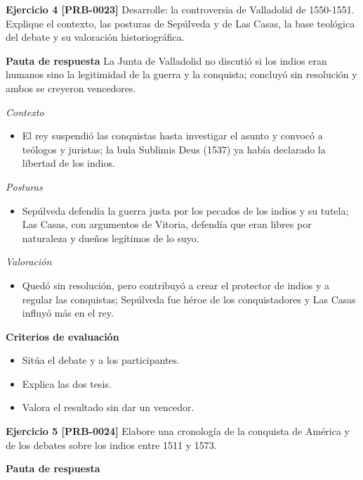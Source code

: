 \documentclass{book}
\begin{document}
\noindent\textbf{Ejercicio 4 [PRB-0023]}
Desarrolle: la controversia de Valladolid de 1550-1551. Explique el contexto, las posturas de Sepúlveda y de Las Casas, la base teológica del debate y su valoración historiográfica.


\noindent\textbf{Pauta de respuesta}
La Junta de Valladolid no discutió si los indios eran humanos sino la legitimidad de la guerra y la conquista; concluyó sin resolución y ambos se creyeron vencedores.


\noindent\textit{Contexto}
\begin{itemize}
\item El rey suspendió las conquistas hasta investigar el asunto y convocó a teólogos y juristas; la bula Sublimis Deus (1537) ya había declarado la libertad de los indios.
\end{itemize}

\noindent\textit{Posturas}
\begin{itemize}
\item Sepúlveda defendía la guerra justa por los pecados de los indios y su tutela; Las Casas, con argumentos de Vitoria, defendía que eran libres por naturaleza y dueños legítimos de lo suyo.
\end{itemize}

\noindent\textit{Valoración}
\begin{itemize}
\item Quedó sin resolución, pero contribuyó a crear el protector de indios y a regular las conquistas; Sepúlveda fue héroe de los conquistadores y Las Casas influyó más en el rey.
\end{itemize}

\noindent\textbf{Criterios de evaluación}
\begin{itemize}
\item Sitúa el debate y a los participantes.
\item Explica las dos tesis.
\item Valora el resultado sin dar un vencedor.
\end{itemize}

\noindent\textbf{Ejercicio 5 [PRB-0024]}
Elabore una cronología de la conquista de América y de los debates sobre los indios entre 1511 y 1573.


\noindent\textbf{Pauta de respuesta}
\end{document}

